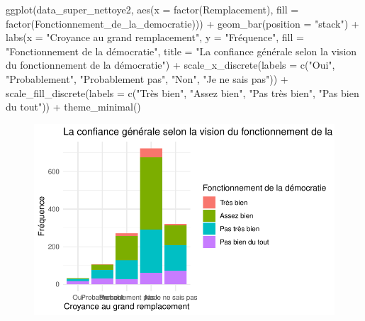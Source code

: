 \documentclass[
  letterpaper,
  DIV=11,
  numbers=noendperiod]{scrartcl}
\newenvironment{Shaded}{\begin{snugshade}}{\end{snugshade}}
\newcommand{\AttributeTok}[1]{\textcolor[rgb]{0.40,0.45,0.13}{#1}}
\newcommand{\FunctionTok}[1]{\textcolor[rgb]{0.28,0.35,0.67}{#1}}
\newcommand{\NormalTok}[1]{\textcolor[rgb]{0.00,0.23,0.31}{#1}}
\newcommand{\SpecialCharTok}[1]{\textcolor[rgb]{0.37,0.37,0.37}{#1}}
\newcommand{\StringTok}[1]{\textcolor[rgb]{0.13,0.47,0.30}{#1}}
\begin{document}
\begin{Shaded}
\begin{Highlighting}[]
\FunctionTok{ggplot}\NormalTok{(data\_super\_nettoye2, }\FunctionTok{aes}\NormalTok{(}\AttributeTok{x =} \FunctionTok{factor}\NormalTok{(Remplacement), }\AttributeTok{fill =} \FunctionTok{factor}\NormalTok{(Fonctionnement\_de\_la\_democratie))) }\SpecialCharTok{+}
  \FunctionTok{geom\_bar}\NormalTok{(}\AttributeTok{position =} \StringTok{"stack"}\NormalTok{) }\SpecialCharTok{+}
  \FunctionTok{labs}\NormalTok{(}\AttributeTok{x =} \StringTok{"Croyance au grand remplacement"}\NormalTok{, }\AttributeTok{y =} \StringTok{"Fréquence"}\NormalTok{, }\AttributeTok{fill =} \StringTok{"Fonctionnement de la démocratie"}\NormalTok{, }\AttributeTok{title =} \StringTok{"La confiance générale selon la vision du fonctionnement de la démocratie"}\NormalTok{) }\SpecialCharTok{+}
  \FunctionTok{scale\_x\_discrete}\NormalTok{(}\AttributeTok{labels =} \FunctionTok{c}\NormalTok{(}\StringTok{"Oui"}\NormalTok{, }\StringTok{"Probablement"}\NormalTok{, }\StringTok{"Probablement pas"}\NormalTok{, }\StringTok{"Non"}\NormalTok{, }\StringTok{"Je ne sais pas"}\NormalTok{)) }\SpecialCharTok{+}
  \FunctionTok{scale\_fill\_discrete}\NormalTok{(}\AttributeTok{labels =} \FunctionTok{c}\NormalTok{(}\StringTok{"Très bien"}\NormalTok{, }\StringTok{"Assez bien"}\NormalTok{, }\StringTok{"Pas très bien"}\NormalTok{, }\StringTok{"Pas bien du tout"}\NormalTok{)) }\SpecialCharTok{+}
  \FunctionTok{theme\_minimal}\NormalTok{()}
\end{Highlighting}
\end{Shaded}

\begin{figure}[H]

{\centering \includegraphics{travail_session_Akyildiz_files/figure-pdf/unnamed-chunk-8-1.pdf}

}

\end{figure}
\end{document}
